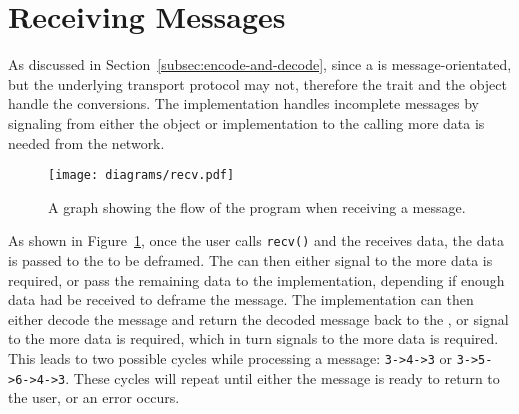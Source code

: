 \section{Receiving Messages}\label{sec:receiving-messages}
As discussed in Section~\ref{subsec:encode-and-decode}, since a \connection{} is message-orientated, but the underlying
transport protocol may not, therefore the \decode{} trait and the \framer{} object handle the conversions.
The implementation handles incomplete messages by signaling from either the \framer{} object or \decode{} implementation
to the calling \connection{} more data is needed from the network.

\begin{figure}[h]
    \texttt{[image: diagrams/recv.pdf]}
    \caption{A graph showing the flow of the program when receiving a message.}
    \label{fig:recv}
\end{figure}

As shown in Figure~\ref{fig:recv}, once the user calls \texttt{recv()} and the \connection{} receives data, the data is
passed to the \framer{} to be deframed.
The \framer{} can then either signal to the \connection{} more data is required, or pass the remaining data to the
\decode{} implementation, depending if enough data had be received to deframe the message.
The \decode{} implementation can then either decode the message and return the decoded message back to the \connection{},
or signal to the \framer{} more data is required, which in turn signals to the \connection{} more data is required.
This leads to two possible cycles while processing a message: \texttt{3->4->3} or \texttt{3->5->6->4->3}.
These cycles will repeat until either the message is ready to return to the user, or an error occurs.

